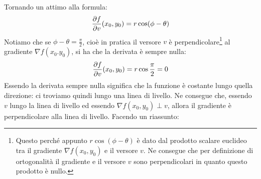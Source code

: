 Tornando un attimo alla formula:
\begin{equation*}
	\pdv{f}{v}()(x_0, y_0) = r \cos(\phi - \theta)
\end{equation*}
Notiamo che se $\phi - \theta = \frac{\pi}{2}$, cioè in pratica il versore $v$ è perpendicolare\footnote{Questo perché appunto $r\cos(\phi - \theta)$ è dato dal prodotto scalare euclideo tra il gradiente $\nabla f(x_0, y_0)$ e il versore $v$. Ne consegue che per definizione di ortogonalità il gradiente e il versore $v$ sono perpendicolari in quanto questo prodotto è nullo.} al gradiente $\nabla f(x_0. y_0)$, si ha che la derivata è sempre nulla:
\begin{equation*}
	\pdv{f}{v}()(x_0, y_0) = r \cos\dfrac{\pi}{2} = 0
\end{equation*}
Essendo la derivata sempre nulla significa che la funzione è costante lungo quella direzione: ci troviamo quindi lungo una linea di livello. Ne consegue che, essendo $v$ lungo la linea di livello ed essendo $\nabla f(x_0, y_0) \perp v$, allora il gradiente è perpendicolare alla linea di livello. Facendo un riassunto:

